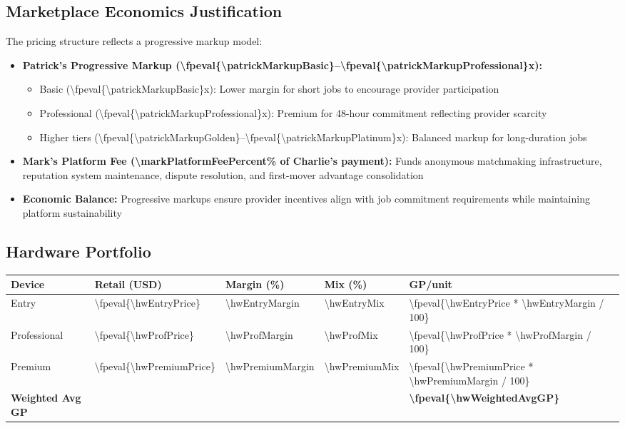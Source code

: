 \documentclass[11pt]{article}
\newcommand{\numfpeval}[1]{\num{\fpeval{#1}}}
\newcommand{\numint}[1]{\num[round-precision=0]{\fpeval{#1}}}
\begin{document}
\subsection{Marketplace Economics Justification}
The pricing structure reflects a progressive markup model:
\begin{itemize}
  \item \textbf{Patrick's Progressive Markup (\numfpeval{\patrickMarkupBasic}--\numfpeval{\patrickMarkupProfessional}x):} 
  \begin{itemize}
    \item Basic (\numfpeval{\patrickMarkupBasic}x): Lower margin for short jobs to encourage provider participation
    \item Professional (\numfpeval{\patrickMarkupProfessional}x): Premium for 48-hour commitment reflecting provider scarcity
    \item Higher tiers (\numfpeval{\patrickMarkupGolden}--\numfpeval{\patrickMarkupPlatinum}x): Balanced markup for long-duration jobs
  \end{itemize}
  \item \textbf{Mark's Platform Fee (\num{\markPlatformFeePercent}\% of Charlie's payment):} Funds anonymous matchmaking infrastructure, reputation system maintenance, dispute resolution, and first-mover advantage consolidation
  \item \textbf{Economic Balance:} Progressive markups ensure provider incentives align with job commitment requirements while maintaining platform sustainability
\end{itemize}

\subsection{Hardware Portfolio}
\begin{table}[H]
\centering
\begin{tabularx}{\linewidth}{l Y Y Y Y}
\toprule
Device & Retail (USD) & Margin (\%)\cite{industrybenchmark2024} & Mix (\%) & GP/unit \\\midrule
Entry        & \numint{\hwEntryPrice}  & \num{\hwEntryMargin} & \num{\hwEntryMix} & \numint{\hwEntryPrice * \hwEntryMargin / 100} \\
Professional & \numint{\hwProfPrice} & \num{\hwProfMargin} & \num{\hwProfMix} & \numint{\hwProfPrice * \hwProfMargin / 100} \\
Premium      & \numint{\hwPremiumPrice} & \num{\hwPremiumMargin} & \num{\hwPremiumMix} & \numint{\hwPremiumPrice * \hwPremiumMargin / 100} \\\midrule
\textbf{Weighted Avg GP} &  &  &  & \textbf{\numint{\hwWeightedAvgGP}} \\
\bottomrule
\end{tabularx}
\end{table}
\end{document}
